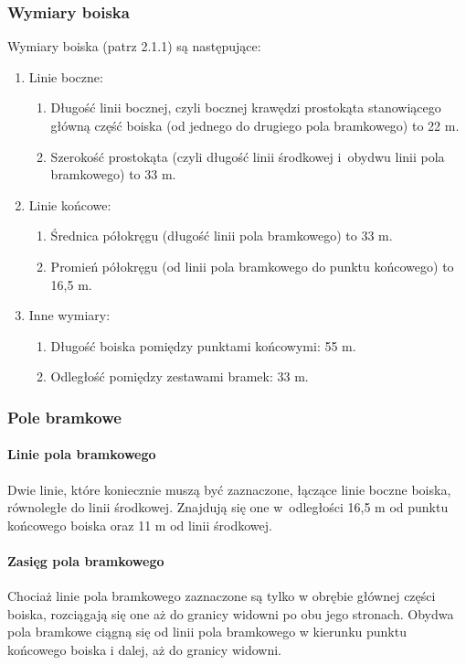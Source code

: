 \documentclass[12pt,a4paper]{article}
\begin{document}
\subsubsection{Wymiary boiska}
Wymiary boiska (patrz 2.1.1) są następujące:
\begin{enumerate}
	\item{Linie boczne:}
	      \begin{enumerate}
		      \item Długość linii bocznej, czyli bocznej krawędzi prostokąta stanowiącego
		            główną część boiska (od jednego do drugiego pola bramkowego) to 22 m.

		      \item Szerokość prostokąta (czyli długość linii środkowej i~obydwu linii
		            pola bramkowego) to 33 m.
	      \end{enumerate}
	\item{Linie końcowe:}
	      \begin{enumerate}
		      \item Średnica półokręgu (długość linii pola bramkowego) to 33 m.

		      \item Promień półokręgu (od linii pola bramkowego do punktu końcowego) to
		            16,5 m.
	      \end{enumerate}
	\item{Inne wymiary:}
	      \begin{enumerate}
		      \item Długość boiska pomiędzy punktami końcowymi: 55 m.

		      \item Odległość pomiędzy zestawami bramek: 33 m.
	      \end{enumerate}
\end{enumerate}

\subsubsection{Pole bramkowe}
\paragraph{Linie pola bramkowego}
Dwie linie, które koniecznie
muszą być zaznaczone, łączące linie boczne boiska, równoległe do linii
środkowej. Znajdują się one w~odległości 16,5 m od punktu końcowego
boiska oraz 11 m od linii środkowej.

\paragraph{Zasięg pola bramkowego}
Chociaż linie pola bramkowego zaznaczone są tylko w obrębie głównej części boiska, rozciągają się one aż do granicy widowni po obu jego stronach. Obydwa pola bramkowe ciągną się od linii pola bramkowego w kierunku punktu końcowego boiska i dalej, aż do granicy widowni.
\end{document}
